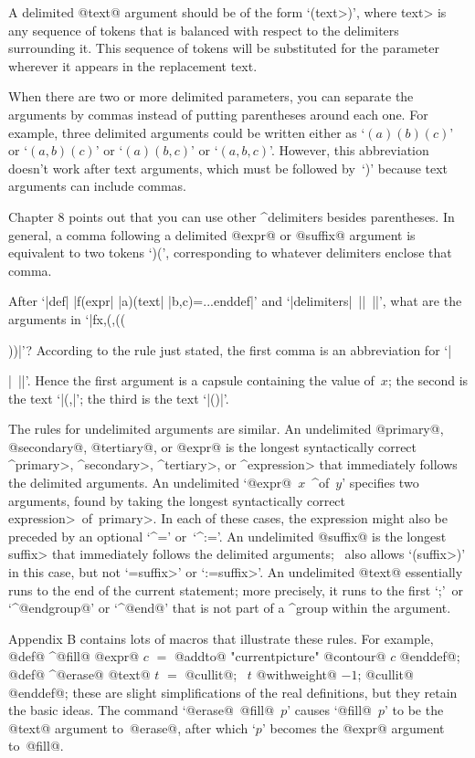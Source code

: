 {{{{\smallskip
\item\bull A delimited @text@ argument should be of the form
`(\<text>)', where \<text> is any sequence of tokens that is balanced
with respect to the delimiters surrounding it. This sequence of tokens
will be substituted for the parameter wherever it appears in the
replacement text.

\smallskip
\item\bull When there are two or more delimited parameters, you can
separate the arguments by commas instead of putting parentheses around
each one. For example, three delimited arguments could be written
either as `$(a)(b)(c)$' or `$(a,b)(c)$' or `$(a)(b,c)$' or `$(a,b,c)$'.
However, this abbreviation doesn't work after text arguments, which
must be followed by~`)' because text arguments can include commas.

\ddanger Chapter 8 points out that you can use other ^{delimiters}
besides parentheses. In general, a comma following a delimited
@expr@ or @suffix@ argument is equivalent to two tokens `)\thinspace(',
corresponding to whatever delimiters enclose that comma.

\ddangerexercise After `|def| |f(expr| |a)(text| |b,c)=...enddef|'
and `|delimiters|~|{{|~|}}|', what are the arguments in
`|f{{x,(,}}((}}))|'?
\answer According to the rule just stated, the first comma is an
abbreviation for `|}}|~|{{|'. Hence the first argument is a capsule
containing the value of~$x$; the second is the text `|(,|'\thinspace;
the third is the text `|(}})|'.

\danger The rules for undelimited arguments are similar. An
undelimited @primary@, @secondary@, @tertiary@, or @expr@ is the
longest syntactically correct ^\<primary>, ^\<secondary>, ^\<tertiary>,
or ^\<expression> that immediately follows the delimited arguments.
An undelimited `@expr@~$x$~^{of}~$y$' specifies two arguments, found
by taking the longest syntactically correct \<expression>~of~\<primary>.
In each of these cases, the expression might also be preceded by an
optional `^{=}' or~`^{:=}'.  An undelimited @suffix@ is the longest
\<suffix> that immediately follows the delimited arguments; \MF\ also
allows `(\<suffix>)' in this case, but not `=\<suffix>' or `:=\<suffix>'.
An undelimited @text@ essentially runs to the end of the current
statement; more precisely, it runs to the first `;'\ or `^@endgroup@' or
`^@end@' that is not part of a ^{group} within the argument.

\danger Appendix B contains lots of macros that illustrate these
rules. For example,
\begindisplay
@def@ ^@fill@ @expr@ $c$ $=$ @addto@ "currentpicture" @contour@ $c$ @enddef@;\cr
@def@ ^@erase@ @text@ $t$ $=$ @cullit@; \ $t$ @withweight@ $-1$;
 @cullit@ @enddef@;\cr
\enddisplay
these are slight simplifications of the real definitions, but they retain the
basic ideas. The command `@erase@~@fill@~$p$' causes `@fill@~$p$' to be
the @text@ argument to~@erase@, after which `$p$' becomes the @expr@
argument to~@fill@.


